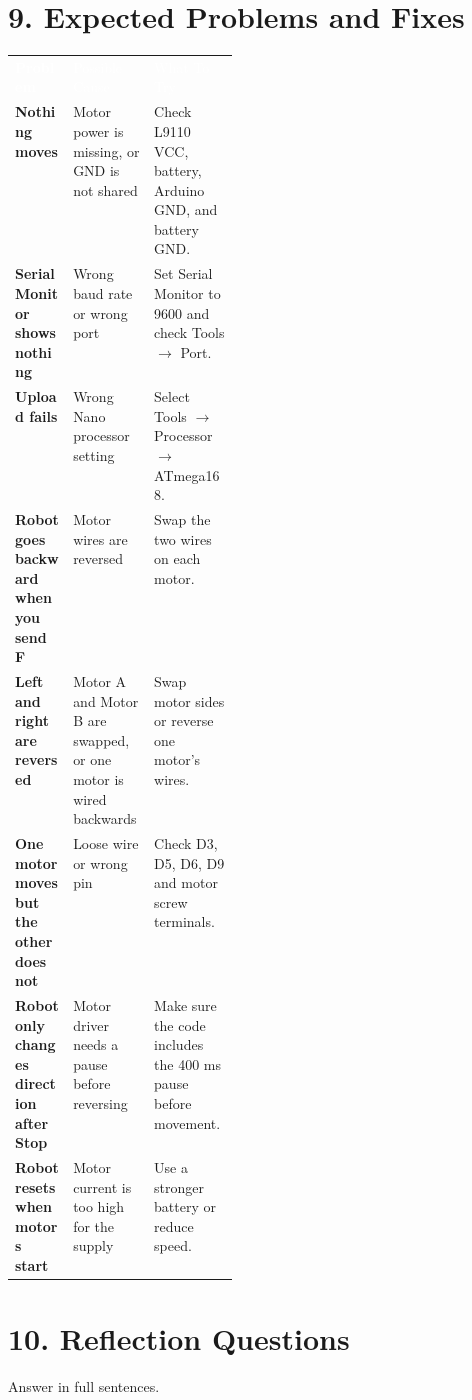 \documentclass[11pt,letterpaper]{article}
\begin{document}
\section*{\textcolor{LabBlue}{9. Expected Problems and Fixes}}

\begin{center}
\begin{tabularx}{\linewidth}{>{\bfseries}p{0.26\linewidth}X X}
\rowcolor{LabOrange}
\textcolor{white}{Problem} & \textcolor{white}{Possible Cause} & \textcolor{white}{What To Try}\\
Nothing moves & Motor power is missing, or GND is not shared & Check L9110 VCC, battery, Arduino GND, and battery GND.\\
Serial Monitor shows nothing & Wrong baud rate or wrong port & Set Serial Monitor to 9600 and check Tools \(\rightarrow\) Port.\\
Upload fails & Wrong Nano processor setting & Select Tools \(\rightarrow\) Processor \(\rightarrow\) ATmega168.\\
Robot goes backward when you send F & Motor wires are reversed & Swap the two wires on each motor.\\
Left and right are reversed & Motor A and Motor B are swapped, or one motor is wired backwards & Swap motor sides or reverse one motor's wires.\\
One motor moves but the other does not & Loose wire or wrong pin & Check D3, D5, D6, D9 and motor screw terminals.\\
Robot only changes direction after Stop & Motor driver needs a pause before reversing & Make sure the code includes the 400 ms pause before movement.\\
Robot resets when motors start & Motor current is too high for the supply & Use a stronger battery or reduce speed.\\
\end{tabularx}
\end{center}

\section*{\textcolor{LabBlue}{10. Reflection Questions}}

Answer in full sentences.
\end{document}
